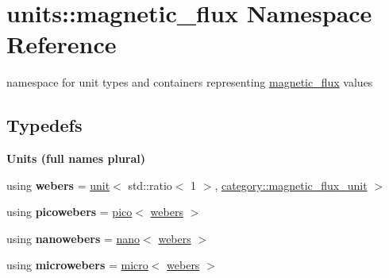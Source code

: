 \hypertarget{namespaceunits_1_1magnetic__flux}{}\section{units\+:\+:magnetic\+\_\+flux Namespace Reference}
\label{namespaceunits_1_1magnetic__flux}


namespace for unit types and containers representing \hyperlink{namespaceunits_1_1magnetic__flux}{magnetic\+\_\+flux} values  


\subsection*{Typedefs}
\begin{Indent}{\bf Units (full names plural)}\par
\begin{DoxyCompactItemize}
\item 
\hypertarget{namespaceunits_1_1magnetic__flux_a07c8efeb58f547bc6ff00c81684510c9}{}using {\bfseries webers} = \hyperlink{structunits_1_1unit}{unit}$<$ std\+::ratio$<$ 1 $>$, \hyperlink{namespaceunits_1_1category_a869ab7acbc230b4c7bc8df74619d2eaa}{category\+::magnetic\+\_\+flux\+\_\+unit} $>$\label{namespaceunits_1_1magnetic__flux_a07c8efeb58f547bc6ff00c81684510c9}

\item 
\hypertarget{namespaceunits_1_1magnetic__flux_a01b4aef2b2bcbec3513bc1ece1b61767}{}using {\bfseries picowebers} = \hyperlink{group___unit_manipulators_ga82a8d14a3e0877a375a66b64c45baab9}{pico}$<$ \hyperlink{structunits_1_1unit}{webers} $>$\label{namespaceunits_1_1magnetic__flux_a01b4aef2b2bcbec3513bc1ece1b61767}

\item 
\hypertarget{namespaceunits_1_1magnetic__flux_ae2a3e2425dd71ea114cbc64c2077ca24}{}using {\bfseries nanowebers} = \hyperlink{group___unit_manipulators_ga1c25c3c1d6c1f3aed3fd1ecf043110d5}{nano}$<$ \hyperlink{structunits_1_1unit}{webers} $>$\label{namespaceunits_1_1magnetic__flux_ae2a3e2425dd71ea114cbc64c2077ca24}

\item 
\hypertarget{namespaceunits_1_1magnetic__flux_ad957db92c6af308e206169d890c79f94}{}using {\bfseries microwebers} = \hyperlink{group___unit_manipulators_gaea53c906ec805110b93f02db4a961971}{micro}$<$ \hyperlink{structunits_1_1unit}{webers} $>$\label{namespaceunits_1_1magnetic__flux_ad957db92c6af308e206169d890c79f94}


\end{DoxyCompactItemize}
\end{Indent}
